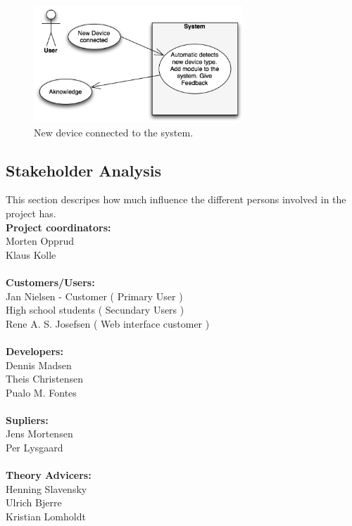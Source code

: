 \begin{figure}[!h]
	\begin{centering}
		\includegraphics[width=0.7\textwidth]{images/usecases2.jpg}
		\caption{New device connected to the system. }
	\end{centering}
\end{figure}
\newpage

\subsection{Stakeholder Analysis}
This section descripes how much influence the different persons
involved in the project has.\\[0.5cm]
\textbf{Project coordinators:}\\ Morten Opprud\\ Klaus Kolle\\
\\
\textbf{Customers/Users:}\\
Jan Nielsen - Customer ( Primary User )\\
High school students ( Secundary Users )\\
Rene A. S. Josefsen ( Web interface customer )\\
\\
\textbf{Developers:}\\
Dennis Madsen\\
Theis Christensen\\
Pualo M. Fontes\\
\\
\textbf{Supliers:}\\
Jens Mortensen\\
Per Lysgaard\\
\\
\textbf{Theory Advicers:}\\
Henning Slavensky\\
Ulrich Bjerre\\
Kristian Lomholdt\\

